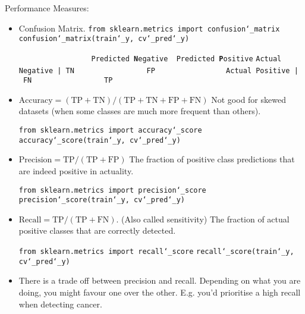 Performance Measures:
\vspace{-3.0mm}
\begin{itemize}

\item
Confusion Matrix.\newline
\texttt{from sklearn.metrics import confusion\char`_matrix}\newline
\texttt{confusion\char`_matrix(train\char`_y, cv\char`_pred\char`_y)}

\texttt{~~~~~~~~~~~~~~~~~Predicted \textbf{N}egative~~Predicted \textbf{P}ositive}\newline
\texttt{Actual Negative~|~TN~~~~~~~~~~~~~~~~~FP~~~~~~~~~~~~~~~~}\newline
\texttt{Actual Positive~|~FN~~~~~~~~~~~~~~~~~TP~~~~~~~~~~~~~~~~}\newline

\item
$\textrm{Accuracy} = (\textrm{TP}+\textrm{TN}) / (\textrm{TP}+\textrm{TN}+\textrm{FP}+\textrm{FN})$\newline
Not good for skewed datasets (when some classes are much more frequent than others).

\texttt{from sklearn.metrics import accuracy\char`_score}\newline
\texttt{accuracy\char`_score(train\char`_y, cv\char`_pred\char`_y)}\newline

\item
$\textrm{Precision} = \textrm{TP} / (\textrm{TP}+\textrm{FP})$\newline
The fraction of positive class predictions that are indeed positive in actuality.

\texttt{from sklearn.metrics import precision\char`_score}\newline
\texttt{precision\char`_score(train\char`_y, cv\char`_pred\char`_y)}\newline

\item
$\textrm{Recall} = \textrm{TP} / (\textrm{TP}+\textrm{FN})$. (Also called sensitivity)\newline
The fraction of actual positive classes that are correctly detected.

\texttt{from sklearn.metrics import recall\char`_score}\newline
\texttt{recall\char`_score(train\char`_y, cv\char`_pred\char`_y)}\newline

\item
There is a trade off between precision and recall.
Depending on what you are doing, you might favour one over the other.
E.g. you'd prioritise a high recall when detecting cancer.\newline


\end{itemize}
